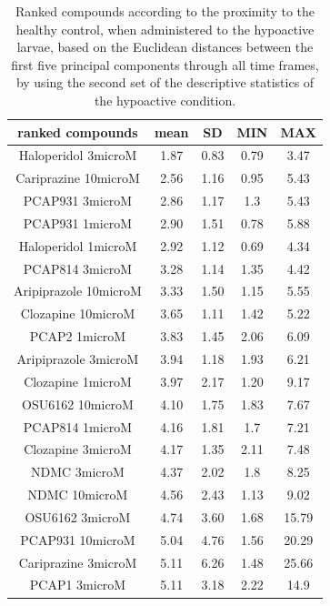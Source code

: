 \documentclass[a4paper,12pt]{article}
\begin{document}
\begin{table}[h!]\tiny
\centering
\caption{Ranked compounds according to the proximity to the healthy control, when administered to the hypoactive larvae, based on the Euclidean distances between the first five principal components through all time frames, by using the second set of the descriptive statistics of the hypoactive condition.}
\begin{tabular}{|c|c|c|c|c|}
\hline
ranked compounds             & mean & SD   & MIN  & MAX   \\ \hline
Haloperidol 3microM   & 1.87  & 0.83  & 0.79 & 3.47  \\ \hline
Cariprazine 10microM  & 2.56  & 1.16  & 0.95 & 5.43  \\ \hline
PCAP931 3microM       & 2.86  & 1.17  & 1.3  & 5.43  \\ \hline
PCAP931 1microM       & 2.90   & 1.51  & 0.78 & 5.88  \\ \hline
Haloperidol 1microM   & 2.92  & 1.12  & 0.69 & 4.34  \\ \hline
PCAP814 3microM       & 3.28  & 1.14  & 1.35 & 4.42  \\ \hline
Aripiprazole 10microM & 3.33  & 1.50   & 1.15 & 5.55  \\ \hline
Clozapine 10microM    & 3.65  & 1.11  & 1.42 & 5.22  \\ \hline
PCAP2 1microM         & 3.83  & 1.45  & 2.06 & 6.09  \\ \hline
Aripiprazole 3microM  & 3.94  & 1.18  & 1.93 & 6.21  \\ \hline
Clozapine 1microM     & 3.97  & 2.17  & 1.20  & 9.17  \\ \hline
OSU6162 10microM      & 4.10   & 1.75  & 1.83 & 7.67  \\ \hline
PCAP814 1microM       & 4.16  & 1.81  & 1.7  & 7.21  \\ \hline
Clozapine 3microM     & 4.17  & 1.35  & 2.11 & 7.48  \\ \hline
NDMC 3microM          & 4.37  & 2.02  & 1.8  & 8.25  \\ \hline
NDMC 10microM         & 4.56  & 2.43  & 1.13 & 9.02  \\ \hline
OSU6162 3microM       & 4.74  & 3.60   & 1.68 & 15.79 \\ \hline
PCAP931 10microM      & 5.04  & 4.76  & 1.56 & 20.29 \\ \hline
Cariprazine 3microM   & 5.11  & 6.26  & 1.48 & 25.66 \\ \hline
PCAP1 3microM         & 5.11  & 3.18  & 2.22 & 14.9  \\ \hline

\end{tabular}
\end{table}
\end{document}
